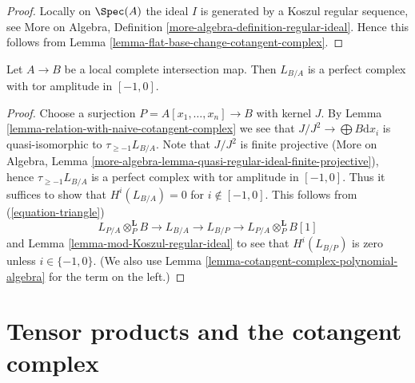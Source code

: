 \begin{proof}
Locally on $\Spec(A)$ the ideal $I$ is generated by a Koszul regular
sequence, see More on Algebra, Definition
\ref{more-algebra-definition-regular-ideal}.
Hence this follows from
Lemma \ref{lemma-flat-base-change-cotangent-complex}.
\end{proof}

\begin{proposition}
\label{proposition-cotangent-complex-local-complete-intersection}
Let $A \to B$ be a local complete intersection map.
Then $L_{B/A}$ is a perfect complex with tor amplitude in $[-1, 0]$.
\end{proposition}

\begin{proof}
Choose a surjection $P = A[x_1, \ldots, x_n] \to B$ with kernel $J$.
By Lemma \ref{lemma-relation-with-naive-cotangent-complex}
we see that $J/J^2 \to \bigoplus B\text{d}x_i$
is quasi-isomorphic to $\tau_{\geq -1}L_{B/A}$.
Note that $J/J^2$ is finite projective
(More on Algebra, Lemma
\ref{more-algebra-lemma-quasi-regular-ideal-finite-projective}),
hence $\tau_{\geq -1}L_{B/A}$ is a perfect complex with
tor amplitude in $[-1, 0]$.
Thus it suffices to show that $H^i(L_{B/A}) = 0$ for $i \not \in [-1, 0]$.
This follows from (\ref{equation-triangle})
$$
L_{P/A} \otimes_P^\mathbf{L} B \to L_{B/A} \to L_{B/P} \to
L_{P/A} \otimes_P^\mathbf{L} B[1]
$$
and Lemma \ref{lemma-mod-Koszul-regular-ideal}
to see that $H^i(L_{B/P})$ is zero unless $i \in \{-1, 0\}$.
(We also use Lemma \ref{lemma-cotangent-complex-polynomial-algebra}
for the term on the left.)
\end{proof}








\section{Tensor products and the cotangent complex}
\label{section-tensor-product}

